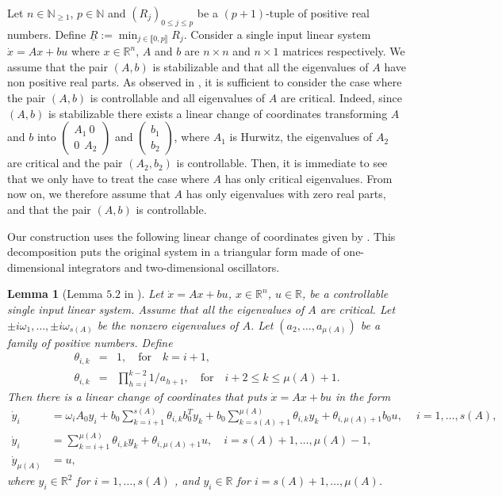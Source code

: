 \documentclass[letterpaper, 10pt]{article}
\newtheorem{lem}{Lemma}
\newcommand{\reels}{\mathbb{R}}
\newcommand{\entiers}{\mathbb{N}}
\begin{document}
Let $n \in \entiers_{\geq 1}$, $p \in \entiers$ and $(R_j)_{0 \leq j \leq p}$ be a $(p+1)$-tuple of positive real numbers. Define $\underline{R}:= \min_{j \in \llbracket 0, p \rrbracket} R_j$. Consider a single input linear system $\dot{x}= Ax +bu$ where $x \in \reels^n$, $A$ and $b$ are $n \times n$ and $n \times 1$ matrices respectively. We assume that the pair $(A,b)$ is stabilizable and that all the eigenvalues of $A$ have non positive real parts. As observed in \cite{SSY}, it is sufficient to consider the case where the pair $(A,b)$ is controllable and all eigenvalues of $A$ are critical. Indeed, since $(A,b)$ is stabilizable there exists a linear change of coordinates transforming $A$ and $b$ into $\begin{pmatrix}A_1\ 0\\0\ \ A_2\end{pmatrix}$ and $ \begin{pmatrix}b_1\\ b_2\end{pmatrix}$,  where $A_1$ is Hurwitz, the eigenvalues of $A_2$ are critical and the pair $(A_2,b_2)$ is controllable. Then, it is immediate to see that we only have to treat the case where $A$ has only critical eigenvalues. From now on, we therefore assume that $A$ has only eigenvalues with zero real parts, and that the pair $(A,b)$ is controllable.

Our construction uses the following linear change of coordinates given by \cite[Lemma 5.2]{SSY}. This decomposition puts the original system in a triangular form made of one-dimensional integrators and two-dimensional oscillators.
\begin{lem}[Lemma $5.2$ in \cite{SSY}]
\label{lem:SSY}
Let $\dot{x}=Ax + b u $, $x \in \reels^n$, $u\in\reels$, be a controllable single input linear system. Assume that all the eigenvalues of $A$ are critical. Let $ \pm i \omega_1, \ldots , \pm i \omega_{s(A)} $ be the nonzero eigenvalues of $A$. Let $(a_2, \ldots , a_{\mu(A)})$ be a family of positive numbers. Define 
\begin{eqnarray}\label{def:theta}
\theta_{i,k}& = & 1  , \quad \text{for} \quad  k=i+1, \nonumber \\ 
\theta_{i,k} & = & \prod_{h=i}^{k-2} 1/a_{h+1}, \quad \text{for} \quad i+2 \leq k \leq \mu(A) +1. 
\end{eqnarray}
Then there is a linear change of coordinates that puts $ \dot{x}=Ax + b u $ in the form
\begin{align}
\dot{y}_i &= \omega_i A_0 y_i + b_0 \sum_{k=i+1}^{s(A)} \theta_{i,k} b_0^T y_k + b_0 \sum_{k=s(A)+1}^{\mu(A)} \theta_{i,k} y_k + \theta_{i,\mu(A)+1}  b_0 u ,\: \quad i=1, \ldots , s(A), \nonumber  \\
\dot{y}_i &= \sum_{k=i+1}^{\mu(A)} \theta_{i,k} y_k + \theta_{i,\mu(A)+1} u, \quad i=s(A)+1 , \ldots , \mu(A)-1,  \label{lem:sys} \\
\dot{y}_{\mu(A)}&= u, \nonumber
\end{align} where $y_i \in \reels^2 $ for $i=1, \ldots , s(A)$ , and $y_i \in \reels$ for $i=s(A)+1 , \ldots , \mu(A)$.
\end{lem}
\end{document}
